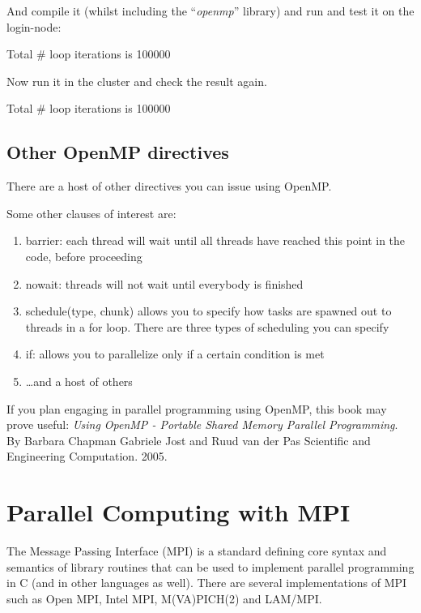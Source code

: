 And compile it (whilst including the ``\emph{openmp}'' library) and run and
test it on the login-node:

\begin{prompt}
Total # loop iterations is 100000
\end{prompt}

Now run it in the cluster and check the result again.

\begin{prompt}
Total # loop iterations is 100000
\end{prompt}

\subsection{Other OpenMP directives}

There are a host of other directives you can issue using OpenMP.

Some other clauses of interest are:

\begin{enumerate}
\item  barrier: each thread will wait until all threads have reached this point in the code, before proceeding
\item  nowait: threads will not wait until everybody is finished
\item  schedule(type, chunk) allows you to specify how tasks are spawned out to threads in a for loop. There are three types of scheduling you can specify
\item  if: allows you to parallelize only if a certain condition is met
\item  \dots  and a host of others
\end{enumerate}

 If you plan engaging in parallel programming using OpenMP, this
book may prove useful: \textit{Using OpenMP - Portable Shared Memory Parallel
Programming}. By Barbara Chapman Gabriele Jost and Ruud van der Pas Scientific
and Engineering Computation. 2005.

\section{Parallel Computing with MPI }

The Message Passing Interface (MPI) is a standard defining core syntax and
semantics of library routines that can be used to implement parallel
programming in C (and in other languages as well). There are several
implementations of MPI such as Open MPI, Intel MPI, M(VA)PICH(2) and LAM/MPI.

